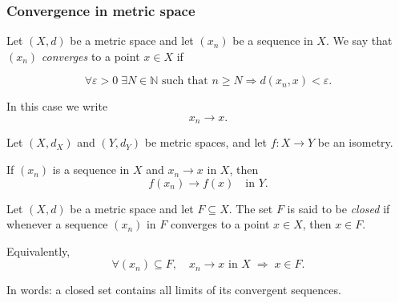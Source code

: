 \subsubsection{Convergence in metric space}
\begin{definition}
Let $(X,d)$ be a metric space and let $(x_n)$ be a sequence in $X$.
We say that $(x_n)$ \emph{converges} to a point $x \in X$ if

\[
\forall \varepsilon > 0 \;\exists N \in \mathbb{N}
\text{ such that }
n \ge N \Rightarrow d(x_n, x) < \varepsilon.
\]

In this case we write
\[
x_n \to x.
\]
\end{definition}


\begin{lemma}
Let $(X,d_X)$ and $(Y,d_Y)$ be metric spaces, and let
$f : X \to Y$ be an isometry.

If $(x_n)$ is a sequence in $X$ and $x_n \to x$ in $X$,
then
\[
f(x_n) \to f(x)
\quad \text{in } Y.
\]
\end{lemma}




\begin{definition}
Let $(X,d)$ be a metric space and let $F \subseteq X$.
The set $F$ is said to be \emph{closed} if whenever a sequence
$(x_n)$ in $F$ converges to a point $x \in X$, then $x \in F$.

Equivalently,
\[
\forall (x_n) \subseteq F,
\quad
x_n \to x \text{ in } X
\;\Longrightarrow\;
x \in F.
\]

In words: a closed set contains all limits of its convergent sequences.
\end{definition}




